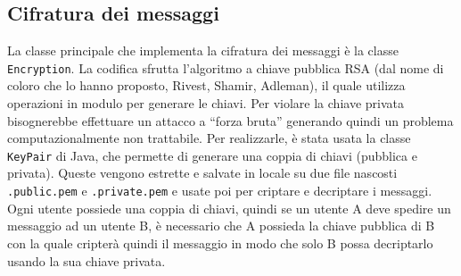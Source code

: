 \subsection{Cifratura dei messaggi}
La classe principale che implementa la cifratura dei messaggi è la classe \texttt{Encryption}.
La codifica sfrutta l'algoritmo a chiave pubblica RSA (dal nome di coloro che
lo hanno proposto, Rivest, Shamir, Adleman), il quale utilizza operazioni in modulo per generare
le chiavi. Per violare la chiave privata bisognerebbe effettuare un attacco a ``forza bruta''
generando quindi un problema computazionalmente non trattabile. Per realizzarle, è stata usata
la classe \texttt{KeyPair} di Java, che permette di generare una coppia di chiavi (pubblica e privata).
Queste vengono estrette e salvate in locale su due file nascosti \texttt{.public.pem} e
\texttt{.private.pem} e usate poi per criptare e decriptare i messaggi.
Ogni utente possiede una coppia di chiavi, quindi se un utente A deve spedire un messaggio
ad un utente B, è necessario che A possieda la chiave pubblica di B con la quale cripterà quindi il
messaggio in modo che solo B possa decriptarlo usando la sua chiave privata.